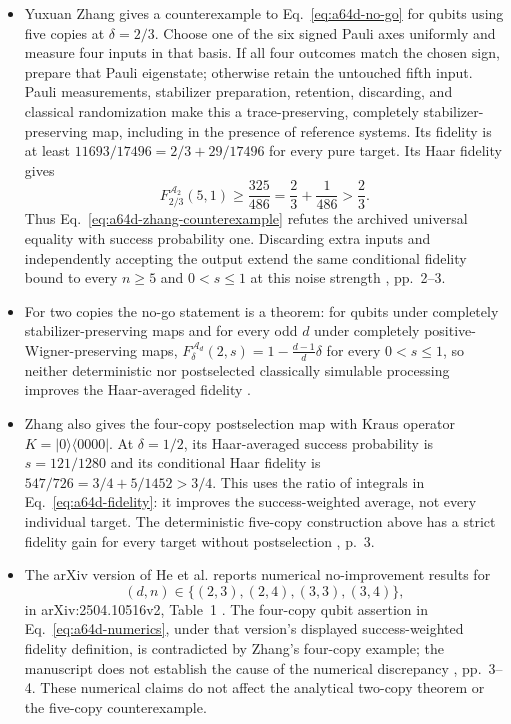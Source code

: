 \begin{itemize}
  \item Yuxuan Zhang gives a counterexample to Eq.~\eqref{eq:a64d-no-go}
  for qubits using five copies at $\delta=2/3$. Choose one of the six signed
  Pauli axes uniformly and measure four inputs in that basis. If all four
  outcomes match the chosen sign, prepare that Pauli eigenstate; otherwise
  retain the untouched fifth input. Pauli measurements, stabilizer
  preparation, retention, discarding, and classical randomization make
  this a trace-preserving, completely stabilizer-preserving map, including
  in the presence of reference systems. Its fidelity is at least
  $11693/17496=2/3+29/17496$ for every pure target. Its Haar fidelity gives
  \begin{equation}
    F^{\mathcal A_2}_{2/3}(5,1)\geq\frac{325}{486}
    =\frac23+\frac1{486}>\frac23.
    \label{eq:a64d-zhang-counterexample}
  \end{equation}
  Thus Eq.~\eqref{eq:a64d-zhang-counterexample} refutes the archived
  universal equality with success probability one. Discarding extra inputs
  and independently accepting the output extend the same conditional
  fidelity bound to every $n\geq5$ and $0<s\leq1$ at this noise strength
  , pp.~2--3.

  \item For two copies the no-go statement is a theorem: for qubits under
  completely stabilizer-preserving maps and for every odd $d$ under
  completely positive-Wigner-preserving maps,
  $F^{\mathcal A_d}_{\delta}(2,s)=1-\frac{d-1}{d}\delta$ for every
  $0<s\leq1$, so neither deterministic nor postselected classically
  simulable processing improves the Haar-averaged fidelity
  .

  \item Zhang also gives the four-copy postselection map with Kraus
  operator $K=|0\rangle\langle0000|$. At $\delta=1/2$, its Haar-averaged
  success probability is $s=121/1280$ and its conditional Haar fidelity is
  $547/726=3/4+5/1452>3/4$. This uses the ratio of integrals in
  Eq.~\eqref{eq:a64d-fidelity}: it improves the success-weighted average,
  not every individual target. The deterministic five-copy construction
  above has a strict fidelity gain for every target without postselection
  , p.~3.

  \item The arXiv version of He et al. reports numerical no-improvement
  results for
  \begin{equation}
    (d,n)\in\{(2,3),(2,4),(3,3),(3,4)\},
    \label{eq:a64d-numerics}
  \end{equation}
  in arXiv:2504.10516v2, Table~1
  . The four-copy qubit assertion
  in Eq.~\eqref{eq:a64d-numerics}, under that version's displayed
  success-weighted fidelity definition, is contradicted by Zhang's
  four-copy example; the manuscript does not establish the cause of the
  numerical discrepancy ,
  pp.~3--4. These numerical claims do not affect the analytical two-copy
  theorem or the five-copy counterexample.


\end{itemize}
